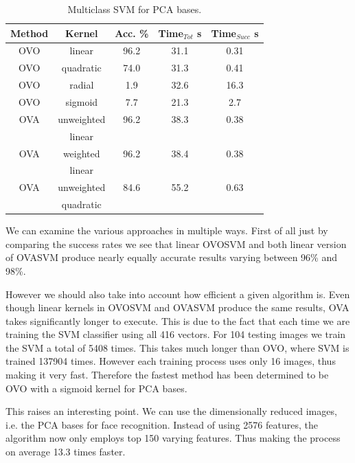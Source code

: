 \documentclass[10pt,twocolumn,letterpaper]{article}
\begin{document}
\begin{table}[H]
\begin{center}
\caption{Multiclass SVM for PCA bases.}  \label{tab:pcasvm}
\small
\begin{tabular}{||c c c c c||}
\hline
\bf Method & \bf Kernel & \bf Acc. \% & \bf Time$_{Tot}$ s & \bf Time$_{Succ}$ s\\ [0.5ex]
\hline \hline
OVO & linear & 96.2 & 31.1 & 0.31\\ [0.5ex]
\hline
OVO & quadratic & 74.0 & 31.3 & 0.41\\ [0.5ex]
\hline
OVO & radial & 1.9 & 32.6 & 16.3\\ [0.5ex]
\hline
OVO & sigmoid & 7.7 & 21.3 & 2.7\\ [0.5ex]
\hline \hline
OVA & unweighted & 96.2 & 38.3 & 0.38\\ [0.5ex]
& linear & & & \\ [0.5ex]
\hline
OVA & weighted & 96.2 & 38.4 & 0.38\\ [0.5ex]
 & linear & & & \\ [0.5ex]
\hline
OVA & unweighted & 84.6 & 55.2 & 0.63\\ [0.5ex]
 & quadratic & & & \\ [0.5ex]
\hline
\end{tabular}
\end{center}

\end{table}

We can examine the various approaches in multiple ways. First of all just by comparing the success rates we see that linear OVOSVM and both linear version of OVASVM produce nearly equally accurate results varying between 96\% and 98\%.

However we should also take into account how efficient a given algorithm is. Even though linear kernels in OVOSVM and OVASVM produce the same results, OVA takes significantly longer to execute. This is due to the fact that each time we are training the SVM classifier using all 416 vectors. For 104 testing images we train the SVM a total of 5408 times. This takes much longer than OVO, where SVM is trained 137904 times. However each training process uses only 16 images, thus making it very fast. Therefore the fastest method has been determined to be OVO with a sigmoid kernel for PCA bases.

This raises an interesting point. We can use the dimensionally reduced images, i.e. the PCA bases for face recognition. Instead of using 2576 features, the algorithm now only employs top 150 varying features. Thus making the process on average 13.3 times faster.
\end{document}
